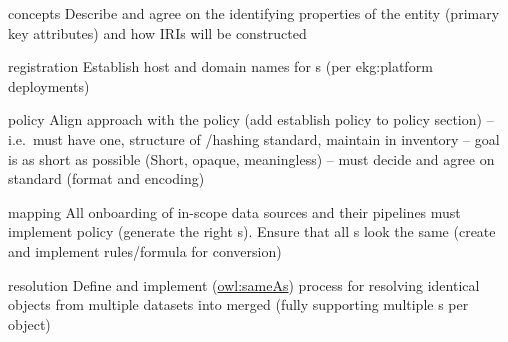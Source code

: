 \ekgmmscoringsection

\ekgmmscoringlevelOne

\begin{scoring}

  \item [concepts] Describe and agree on the identifying properties of the entity (primary key
        attributes) and how IRIs will be constructed
  \item [registration] Establish host and domain names for s (per \gls{ekg:platform} deployments)
  \item [policy] Align approach with the  policy (add establish policy to policy section) --
        i.e.\ must have one, structure of /hashing standard, maintain in inventory --
        goal is as short as possible (Short, opaque, meaningless) --
        must decide and agree on standard (format and encoding)
  \item [mapping] All onboarding of in-scope data sources and their  pipelines must implement policy
        (generate the right s).
        Ensure that all s look the same (create and implement rules/formula for conversion)
  \item [resolution] Define and implement (\href{https://www.w3.org/TR/owl-ref/\#sameAs-def}{owl:sameAs}) process for
        resolving identical objects from multiple datasets into merged  (fully supporting
        multiple s per object)

\end{scoring}

\ekgmmscoringlevelTwo

